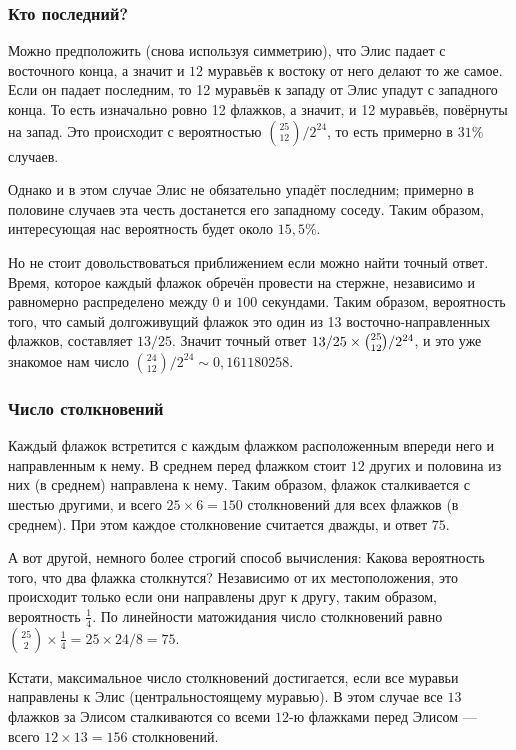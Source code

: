 \subsubsection*{Кто последний?}

Можно предположить (снова используя симметрию), что Элис падает с восточного конца,
а значит и $12$ муравьёв к востоку от него делают то же самое.
Если он падает последним, то 12 муравьёв к западу от Элис упадут с западного конца.
То есть изначально ровно 12 флажков, а значит, и 12 муравьёв, повёрнуты на запад.
Это происходит с вероятностью $\binom{25}{12}/2^{24}$, то есть примерно в $31\%$ случаев.

Однако и в этом случае Элис не обязательно упадёт последним;
примерно в половине случаев эта честь достанется его западному соседу.
Таким образом, интересующая нас вероятность будет около $15{,}5\%$.

Но не стоит довольствоваться приближением если можно найти точный ответ.
Время, которое каждый флажок обречён провести на стержне, независимо и равномерно распределено между $0$ и $100$ секундами.
Таким образом, вероятность того, что самый долгоживущий флажок это один из 13 восточно-направленных флажков, составляет $13/25$.
Значит точный ответ $13/25 \z\times\binom{25}{12}/2^{24}$, и это уже знакомое нам число $\binom{24}{12}/2^{24}\sim 0{,}161180258$.

\subsubsection*{Число столкновений}

Каждый флажок встретится с каждым флажком расположенным впереди него и направленным к нему.
В среднем перед флажком стоит $12$ других и
половина из них (в среднем) направлена к нему.
Таким образом, флажок сталкивается с шестью другими, и всего $25 \times 6 = 150$ столкновений для всех флажков (в среднем).
При этом каждое столкновение считается дважды, и ответ $75$.

А вот другой, немного более строгий способ вычисления:
Какова вероятность того, что два флажка столкнутся?
Независимо от их местоположения, это происходит только если они направлены друг к другу,
таким образом, вероятность $\tfrac14$.
По линейности матожидания число столкновений равно $\binom{25}2 \times \tfrac14 = 25 \times 24 /8 = 75$.

Кстати, максимальное число столкновений достигается, если все муравьи направлены к Элис (центральностоящему муравью).
В этом случае все $13$ флажков за Элисом сталкиваются со всеми $12$-ю флажками перед Элисом --- всего $12 \times 13 = 156$ столкновений.

